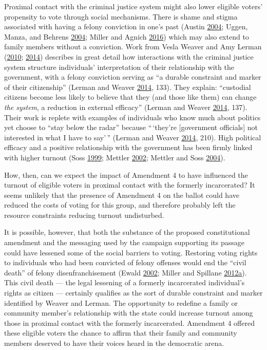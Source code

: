 \documentclass[
  12pt,
]{article}
\begin{document}
Proximal contact with the criminal justice system might also lower eligible voters' propensity to vote through social mechanisms. There is shame and stigma associated with having a felony conviction in one's past (Austin \protect\hyperlink{ref-Austin2004}{2004}; Uggen, Manza, and Behrens \protect\hyperlink{ref-Uggen2004a}{2004}; Miller and Agnich \protect\hyperlink{ref-Miller2016}{2016}) which may also extend to family members without a conviction. Work from Vesla Weaver and Amy Lerman (\protect\hyperlink{ref-Weaver2010}{2010}; \protect\hyperlink{ref-Lerman2014}{2014}) describes in great detail how interactions with the criminal justice system structure individuals' interpretation of their relationship with the government, with a felony conviction serving as ``a durable constraint and marker of their citizenship'' (Lerman and Weaver \protect\hyperlink{ref-Lerman2014}{2014}, 133). They explain: ``custodial citizens become less likely to believe that they (and those like them) can change \emph{the system}, a reduction in external efficacy'' (Lerman and Weaver \protect\hyperlink{ref-Lerman2014}{2014}, 137). Their work is replete with examples of individuals who know much about politics yet choose to ``stay below the radar'' because ``\,`they're {[}government officials{]} not interested in what I have to say'\,'' (Lerman and Weaver \protect\hyperlink{ref-Lerman2014}{2014}, 210). High political efficacy and a positive relationship with the government has been firmly linked with higher turnout (Soss \protect\hyperlink{ref-Soss1999}{1999}; Mettler \protect\hyperlink{ref-Mettler2002}{2002}; Mettler and Soss \protect\hyperlink{ref-Mettler2004}{2004}).

How, then, can we expect the impact of Amendment 4 to have influenced the turnout of eligible voters in proximal contact with the formerly incarcerated? It seems unlikely that the presence of Amendment 4 on the ballot could have reduced the costs of voting for this group, and therefore probably left the resource constraints reducing turnout undisturbed.

It is possible, however, that both the substance of the proposed constitutional amendment and the messaging used by the campaign supporting its passage could have lessened some of the social barriers to voting. Restoring voting rights to individuals who had been convicted of felony offenses would end the ``civil death'' of felony disenfranchisement (Ewald \protect\hyperlink{ref-Ewald2002}{2002}; Miller and Spillane \protect\hyperlink{ref-Miller2012}{2012}\protect\hyperlink{ref-Miller2012}{a}). This civil death --- the legal lessening of a formerly incarcerated individual's rights as citizen --- certainly qualifies as the sort of durable constraint and marker identified by Weaver and Lerman. The opportunity to redefine a family or community member's relationship with the state could increase turnout among those in proximal contact with the formerly incarcerated. Amendment 4 offered these eligible voters the chance to affirm that their family and community members deserved to have their voices heard in the democratic arena.
\end{document}
